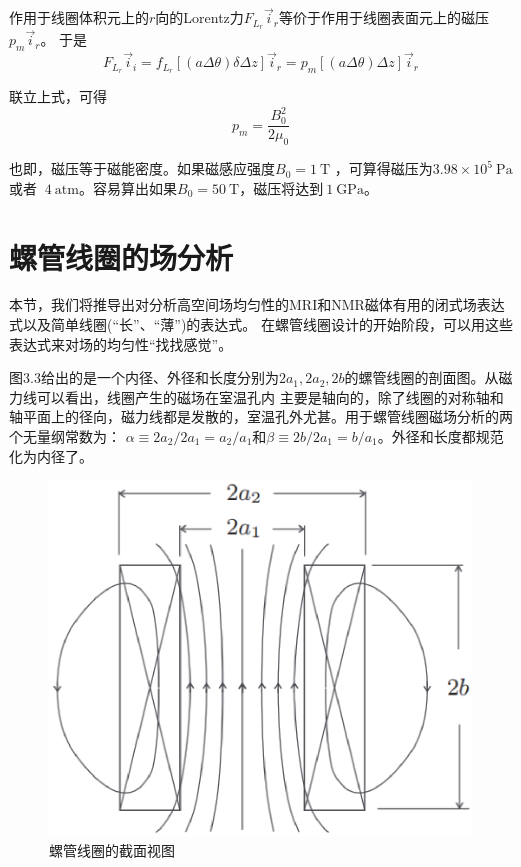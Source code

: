 作用于线圈体积元上的$r$向的Lorentz力$F_{L_r}\vec{i}_r$等价于作用于线圈表面元上的磁压$p_m\vec{i}_r$。
于是
\begin{equation}\label{eqn:inf solenoid fl2}
  F_{L_r}\vec{i}_i =f_{L_r}[(a\Delta \theta)\delta \Delta z]\vec{i}_r=p_m[(a\Delta \theta)\Delta z]\vec{i}_r
\end{equation}

联立上式，可得
\begin{equation}\label{eqn:mag press}
  p_m=\frac{B_0^2}{2\mu_0}
\end{equation}

也即，磁压等于磁能密度。如果磁感应强度$B_0=1\ \mathrm{T}$ ，可算得磁压为$3.98\times 10^5 \ \mathrm{Pa}$或者
$~4  \ \mathrm{atm}$。容易算出如果$B_0=50 \ \mathrm{T}$，磁压将达到$~1 \ \mathrm{GPa}$。

\section{螺管线圈的场分析}
本节，我们将推导出对分析高空间场均匀性的MRI和NMR磁体有用的闭式场表达式以及简单线圈(“长”、“薄”)的表达式。
在螺管线圈设计的开始阶段，可以用这些表达式来对场的均匀性“找找感觉”。

图3.3给出的是一个内径、外径和长度分别为$2a_1, 2a_2, 2b$的螺管线圈的剖面图。从磁力线可以看出，线圈产生的磁场在室温孔内
主要是轴向的，除了线圈的对称轴和轴平面上的径向，磁力线都是发散的，室温孔外尤甚。用于螺管线圈磁场分析的两个无量纲常数为：
$\alpha\equiv 2a_2/2a_1=a_2/a_1$和$\beta\equiv 2b/2a_1=b/a_1$。外径和长度都规范化为内径了。
\begin{figure}[htbp]
	\centering
	\includegraphics[scale=0.5]{chpt3/figs/fig3.3.eps}
	\caption{螺管线圈的截面视图}
\end{figure}

